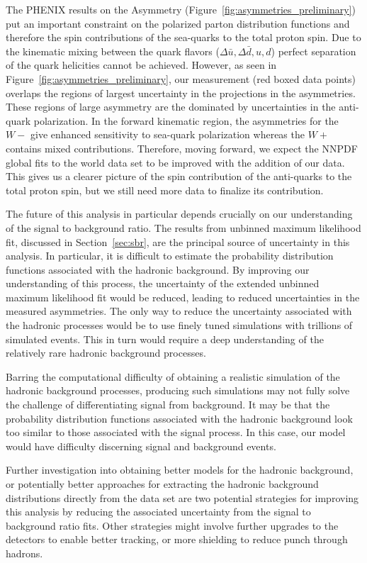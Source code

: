 The PHENIX results on the Asymmetry (Figure~\ref{fig:asymmetries_preliminary})
put an important constraint on the polarized parton distribution functions and
therefore the spin contributions of the sea-quarks to the total proton spin. Due
to the kinematic mixing between the quark flavors ($\Delta\bar{u},
\Delta\bar{d}, u, d$) perfect separation of the quark helicities cannot be
achieved. However, as seen in Figure~\ref{fig:asymmetries_preliminary}, our
measurement (red boxed data points) overlaps the regions of largest uncertainty
in the projections in the asymmetries. These regions of large asymmetry are the
dominated by uncertainties in the anti-quark polarization. In the forward
kinematic region, the asymmetries for the $W-$ give enhanced sensitivity to
sea-quark polarization whereas the $W+$ contains mixed contributions.
Therefore, moving forward, we expect the NNPDF global fits to the world data set
to be improved with the addition of our data. This gives us a clearer picture of
the spin contribution of the anti-quarks to the total proton spin, but we still
need more data to finalize its contribution.

The future of this analysis in particular depends crucially on our understanding
of the signal to background ratio. The results from unbinned maximum likelihood
fit, discussed in Section~\ref{sec:sbr}, are the principal source of uncertainty
in this analysis. In particular, it is difficult to estimate the probability
distribution functions associated with the hadronic background. By improving our
understanding of this process, the uncertainty of the extended unbinned
maximum likelihood fit would be reduced, leading to reduced uncertainties in the
measured asymmetries. The only way to reduce the uncertainty associated with the
hadronic processes would be to use finely tuned simulations with trillions of
simulated events. This in turn would require a deep understanding of the
relatively rare hadronic background processes.

Barring the computational difficulty of obtaining a realistic simulation of the
hadronic background processes, producing such simulations may not fully solve the
challenge of differentiating signal from background. It may be that the
probability distribution functions associated with the hadronic background look
too similar to those associated with the signal process. In this case, our model
would have difficulty discerning signal and background events.

Further investigation into obtaining better models for the hadronic background,
or potentially better approaches for extracting the hadronic background
distributions directly from the data set are two potential strategies for
improving this analysis by reducing the associated uncertainty from the signal to
background ratio fits. Other strategies might involve further upgrades to the
detectors to enable better tracking, or more shielding to reduce punch through
hadrons.

